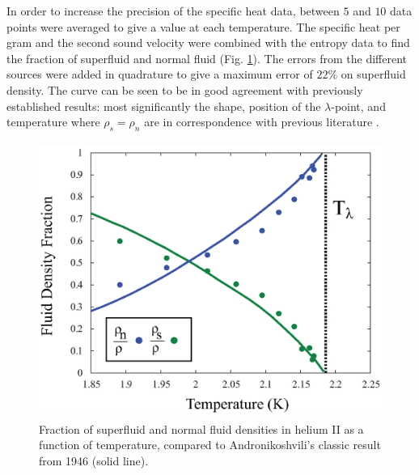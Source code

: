 In order to increase the precision of the specific heat data, between
$5$ and $10$ data points were averaged to give a value at each
temperature. The specific heat per gram and the second sound velocity
were combined with the entropy data to find the fraction of superfluid
and normal fluid (Fig. \ref{fig:density}). The errors from the
different sources were added in quadrature to give a maximum error of
$22\%$ on superfluid density. The curve can be seen to be in good
agreement with previously established results: most significantly the
shape, position of the $\lambda$-point, and temperature where $\rho_s
= \rho_n$ are in correspondence with previous literature \cite{andro}.
\begin{figure}[htbp]
\begin{center}
\includegraphics[height=90mm]{./figures/density.eps}
\caption{\small{Fraction of superfluid and normal fluid densities in
    helium II as a function of temperature, compared to
    Andronikoshvili's classic result from 1946 (solid
    line)\cite{andro}.}}
\label{fig:density}
\end{center}
\end{figure}
